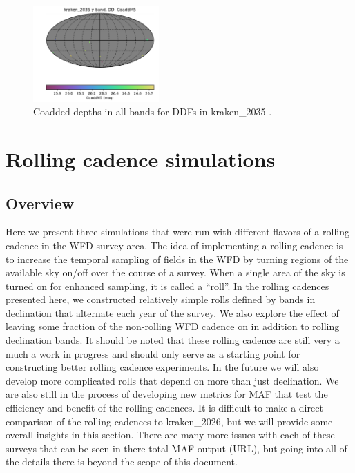 \documentclass[DM,lsstdraft,authoryear,toc]{lsstdoc}
\begin{document}
\begin{figure}[ht]
\includegraphics[width=0.43\textwidth]{figures/kraken_2035_CoaddM5_y_band_DD_HEAL_SkyMap.pdf}
\caption{Coadded depths in all bands for DDFs in kraken\_2035 .}
\label{fig:ddcoad-2035}
\end{figure}

\clearpage

\section{Rolling cadence simulations}

\subsection{Overview}

Here we present three simulations that were run with different flavors of a rolling cadence in the WFD survey area.
The idea of implementing a rolling cadence is to increase the temporal sampling of fields in the WFD by turning
regions of the available sky on/off over the course of a survey. When a single area of the sky is turned on for 
enhanced sampling, it is called a ``roll''. In the rolling cadences presented here, we constructed relatively simple
rolls defined by bands in declination that alternate each year of the survey. We also explore the
effect of leaving some fraction of the non-rolling WFD cadence on in addition to rolling declination bands.
It should be noted that these rolling cadence are still very a much a work in progress and should only
serve as a starting point for constructing better rolling cadence experiments. In the future we will also develop more
complicated rolls that depend on more than just declination. We are also still in the process of developing new
metrics for MAF that test the efficiency and benefit of the rolling cadences. It is difficult to make a direct comparison
of the rolling cadences to kraken\_2026, but we will provide some overall insights in this section. There are many
more issues with each of these surveys that can be seen in there total MAF output (URL), but going into
all of the details there is beyond the scope of this document.
\end{document}
